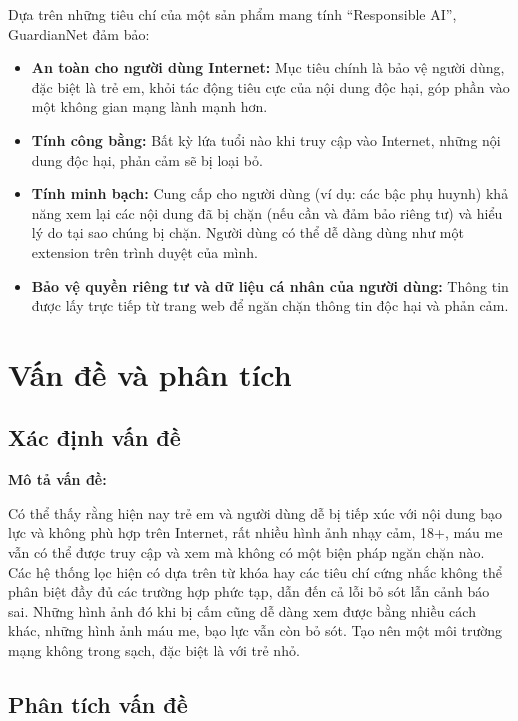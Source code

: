 \documentclass[12pt,a4paper]{article}
\begin{document}
Dựa trên những tiêu chí của một sản phẩm mang tính ``Responsible AI'', GuardianNet đảm bảo:

\begin{itemize}
  \item \textbf{An toàn cho người dùng Internet:} Mục tiêu chính là bảo vệ người dùng, đặc biệt là trẻ em, khỏi tác động tiêu cực của nội dung độc hại, góp phần vào một không gian mạng lành mạnh hơn.

  \item \textbf{Tính công bằng:} Bất kỳ lứa tuổi nào khi truy cập vào Internet, những nội dung độc hại, phản cảm sẽ bị loại bỏ.

  \item \textbf{Tính minh bạch:} Cung cấp cho người dùng (ví dụ: các bậc phụ huynh) khả năng xem lại các nội dung đã bị chặn (nếu cần và đảm bảo riêng tư) và hiểu lý do tại sao chúng bị chặn. Người dùng có thể dễ dàng dùng như một extension trên trình duyệt của mình.

  \item \textbf{Bảo vệ quyền riêng tư và dữ liệu cá nhân của người dùng:} Thông tin được lấy trực tiếp từ trang web để ngăn chặn thông tin độc hại và phản cảm.
\end{itemize}

\section{Vấn đề và phân tích}

\subsection{Xác định vấn đề}

\textbf{Mô tả vấn đề:}

Có thể thấy rằng hiện nay trẻ em và người dùng dễ bị tiếp xúc với nội dung bạo lực và không phù hợp trên Internet, rất nhiều hình ảnh nhạy cảm, 18+, máu me vẫn có thể được truy cập và xem mà không có một biện pháp ngăn chặn nào. Các hệ thống lọc hiện có dựa trên từ khóa hay các tiêu chí cứng nhắc không thể phân biệt đầy đủ các trường hợp phức tạp, dẫn đến cả lỗi bỏ sót lẫn cảnh báo sai. Những hình ảnh đó khi bị cấm cũng dễ dàng xem được bằng nhiều cách khác, những hình ảnh máu me, bạo lực vẫn còn bỏ sót. Tạo nên một môi trường mạng không trong sạch, đặc biệt là với trẻ nhỏ.

\subsection{Phân tích vấn đề}
\end{document}
